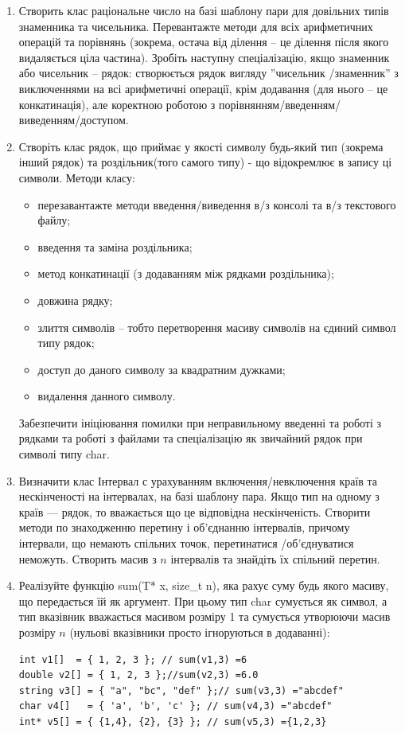 \documentclass[a5paper,titlepage,openany,twoside,draft]{book_unv}%
\begin{document}
\begin{enumerate}
\item
Створить клас раціональне число на базі шаблону пари для довільних типів знаменника та чисельника.
Перевантажте методи для всіх арифметичних операцій та порівнянь 
(зокрема, остача від ділення -- це ділення після якого видаляється ціла частина). 
Зробіть наступну спеціалізацію, якщо знаменник або чисельник -- рядок:
створюється рядок вигляду ''{чисельник} /{знаменник}'' з виключеннями на всі арифметичні операції,
крім додавання (для нього -- це конкатинація), але коректною роботою з 
порівнянням/введенням/виведенням/доступом.

\item
Створіть клас рядок, що приймає у якості символу будь-який тип (зокрема інший рядок) 
та роздільник(того самого типу) - що відокремлює в запису ці символи. 
Методи класу:
\begin{itemize}
\item
перезавантажте методи введення/виведення в/з консолі та в/з текстового файлу;
\item
введення та заміна роздільника;
\item
метод конкатинації (з додаванням між рядками роздільника);
\item
довжина рядку;
\item
злиття символів -- тобто перетворення масиву символів на єдиний символ типу рядок;
\item
доступ до даного символу за квадратним дужками;
\item
видалення данного символу.
\end{itemize}
Забезпечити ініціювання помилки при неправильному введенні та роботі з рядками 
та роботі з файлами та спеціалізацію як звичайний рядок при символі типу char.

\item
Визначити клас Інтервал с урахуванням включення/невключення країв та нескінченості на інтервалах,
на базі шаблону пара. Якщо тип на одному з країв --- рядок, то вважається 
що це відповідна нескінченість.  
Створити методи по знаходженню перетину і об'єднанню інтервалів, 
причому інтервали, що немають спільних точок, перетинатися /об'єднуватися неможуть. 
Створить масив з $n$ інтервалів та знайдіть їх спільний перетин.
 
\item
Реалізуйте функцію sum(T* x, size\_t n), яка рахує суму будь якого масиву, що передається їй як аргумент.
При цьому тип char сумується як символ, а тип вказівник вважається масивом розміру 1 та сумується утворюючи 
масив розміру $n$ (нульові вказівники просто ігноруються в додаванні):
\begin{verbatim}
int v1[]  = { 1, 2, 3 }; // sum(v1,3) =6 
double v2[] = { 1, 2, 3 };//sum(v2,3) =6.0 
string v3[] = { "a", "bc", "def" };// sum(v3,3) ="abcdef"
char v4[]   = { 'a', 'b', 'c' }; // sum(v4,3) ="abcdef"
int* v5[] = { {1,4}, {2}, {3} }; // sum(v5,3) ={1,2,3}
\end{verbatim}


\end{enumerate}
\end{document}
